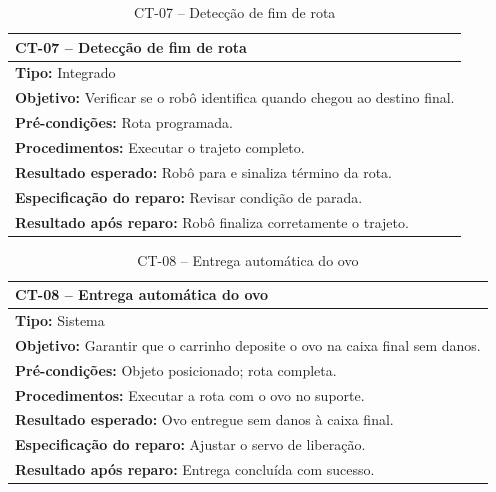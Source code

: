 
\begin{table}[H]
\centering
\begin{tabular}{|p{}|}
\hline
\textbf{CT-07 – Detecção de fim de rota} \\ \hline
\textbf{Tipo:} Integrado \\ \hline
\textbf{Objetivo:} Verificar se o robô identifica quando chegou ao destino final. \\ \hline
\textbf{Pré-condições:} Rota programada. \\ \hline
\textbf{Procedimentos:} Executar o trajeto completo. \\ \hline
\textbf{Resultado esperado:} Robô para e sinaliza término da rota. \\ \hline
\textbf{Especificação do reparo:} Revisar condição de parada. \\ \hline
\textbf{Resultado após reparo:} Robô finaliza corretamente o trajeto. \\ \hline
\end{tabular}
\caption{CT-07 – Detecção de fim de rota}
\end{table}


\begin{table}[H]
\centering
\begin{tabular}{|p{}|}
\hline
\textbf{CT-08 – Entrega automática do ovo} \\ \hline
\textbf{Tipo:} Sistema \\ \hline
\textbf{Objetivo:} Garantir que o carrinho deposite o ovo na caixa final sem danos. \\ \hline
\textbf{Pré-condições:} Objeto posicionado; rota completa. \\ \hline
\textbf{Procedimentos:} Executar a rota com o ovo no suporte. \\ \hline
\textbf{Resultado esperado:} Ovo entregue sem danos à caixa final. \\ \hline
\textbf{Especificação do reparo:} Ajustar o servo de liberação. \\ \hline
\textbf{Resultado após reparo:} Entrega concluída com sucesso. \\ \hline
\end{tabular}
\caption{CT-08 – Entrega automática do ovo}
\end{table}

